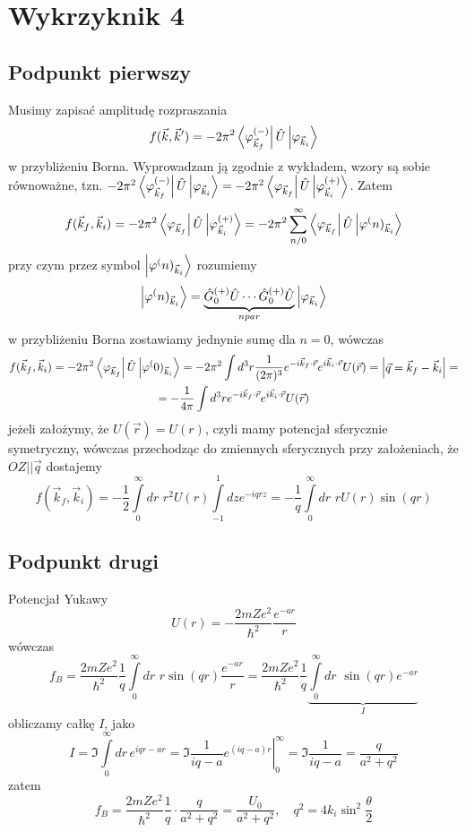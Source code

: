 \documentclass[a4paper,12pt]{article}
\begin{document}
    \section{Wykrzyknik 4}
    	\subsection{Podpunkt pierwszy}
    	Musimy zapisać amplitudę rozpraszania
    	$$
    		f(\vec{k},\vec{k}') =-2\pi^2\bra{\varphi^{(-)}_{\vec{k}_f}}\hat{U}\ket{\varphi_{\vec{k}_i}}
    	$$
    	w przybliżeniu Borna. Wyprowadzam ją zgodnie z wykładem, wzory są sobie równoważne, tzn. $-2\pi^2\bra{\varphi^{(-)}_{\vec{k}_f}}\hat{U}\ket{\varphi_{\vec{k}_i}}= -2\pi^2\bra{\varphi_{\vec{k}_f}}\hat{U}\ket{\varphi_{\vec{k}_i}^{(+)}}$. Zatem
    	$$
    		f(\vec{k}_f,\vec{k}_i) =-2\pi^2\bra{\varphi_{\vec{k}_f}}\hat{U}\ket{\varphi_{\vec{k}_i}^{(+)}} = -2\pi^2\sum\limits_{n/0}^\infty\bra{\varphi_{\vec{k}_f}}\hat{U}\ket{\varphi^(n)_{\vec{k}_i}}
    	$$
    	przy czym przez symbol $\ket{\varphi^(n)_{\vec{k}_i}}$ rozumiemy
    	$$
    		\ket{\varphi^(n)_{\vec{k}_i}} = \underbrace{\hat{G}_0^{(+)}\hat{U}\cdots\hat{G}_0^{(+)}\hat{U}}_{n par}\ket{\varphi_{\vec{k}_i}}
    	$$
    	w przybliżeniu Borna zostawiamy jednynie sumę dla $n=0$, wówczas
    	$$
    	\begin{gathered}
    		f(\vec{k}_f,\vec{k}_i) = -2\pi^2\bra{\varphi_{\vec{k}_f}}\hat{U}\ket{\varphi^(0)_{\vec{k}_i}} = -2\pi^2\int d^3 r\frac{1}{(2\pi)^3}e^{-i\vec{k}_f\cdot\vec{r}}e^{i\vec{k}_i\cdot\vec{r}}U(\vec{r}) = 
    		\begin{vmatrix}
    			\vec{q} = \vec{k}_f - \vec{k}_i
    		\end{vmatrix} = \\=-\frac{1}{4\pi}\int d^3r e^{-i\vec{k}_f\cdot\vec{r}}e^{i\vec{k}_i\cdot\vec{r}}U(\vec{r}) 
    	\end{gathered}
    	$$
    	jeżeli założymy, że $U(\vec{r}) = U(r)$, czyli mamy potencjał sferycznie symetryczny, wówczas przechodząc do zmiennych sferycznych przy założeniach, że
    	$OZ||\vec{q}$ dostajemy
    	$$
    		f(\vec{k}_f,\vec{k}_i) = -\frac{1}{2}\int\limits_0^\infty dr\,\, r^2 U(r) \int\limits_{-1}^1 dz e^{-iqrz} = -\frac{1}{q}\int\limits_0^\infty dr\,\, r U(r)\sin(qr)
    	$$
    	\subsection{Podpunkt drugi}
    	Potencjał Yukawy
    	$$
    		U(r) = -\frac{2mZe^2}{\hbar^2}\frac{e^{-ar}}{r}
    	$$
    	wówczas
    	$$
    		f_B = \frac{2mZe^2}{\hbar^2}\frac{1}{q}\int\limits_0^\infty dr\,\, r\sin(qr)\frac{e^{-ar}}{r} =\frac{2mZe^2}{\hbar^2}\frac{1}{q}\underbrace{\int\limits_0^\infty dr\,\,\sin(qr)e^{-ar}}_{I} 
    	$$
    	obliczamy całkę $I$, jako
    	$$
    		I=\Im{\int\limits_0^\infty dr\, e^{iqr-ar}} =\Im{\left.\frac{1}{iq-a}e^{(iq-a)r}\right|_0^\infty} = \Im{\frac{1}{iq-a}} = \frac{q}{a^2+q^2}
    	$$
    	zatem
    	$$
    		f_B = \frac{2mZe^2}{\hbar^2}\frac{1}{q}\cdot\frac{q}{a^2+q^2} = \frac{U_0}{a^2+q^2},\quad q^2 = 4k_i\sin^2{\frac{\theta}{2}}
    	$$
\end{document}
